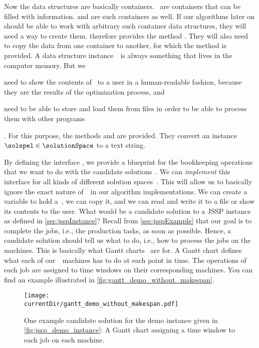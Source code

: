 Now the data structures are basically containers.
\numpyndarrays\ are containers that can be filled with information.
 and  are such containers as well.
If our algorithms later on should be able to work with arbitrary such container data structures, they will need a way to create them.
 therefore provides the method .
They will also need to copy the data from one container to another, for which the  method is provided.
A data structure instance~\solspel\ is always something that lives in the computer memory.
But we \begin{enumerate*}[label=\emph{\alph*})]%
\item need to show the contents of \solspel\ to a user in a human-readable fashion, because they are the results of the optimization process, and%
\item need to be able to store and load them from files in order to be able to process them with other programs%
\end{enumerate*}.
For this purpose, the methods  and  are provided.
They convert an instance $\solspel\in\solutionSpace$ to a text string.

By defining the interface , we provide a blueprint for the bookkeeping operations that we want to do with the candidate solutions~\solspel.
We can \emph{implement} this interface for all kinds of different solution spaces~\solutionSpace.
This will allow us to basically ignore the exact nature of~\solutionSpace\ in our algorithm implementations.
We can create a variable to hold a~\solspel, we can copy it, and we can read and write it to a file or show its contents to the user.
%
\endhsection%
%
%
%
What would be a candidate solution to a \gls{JSSP} instance as defined in \autoref{sec:jsspInstance}?
Recall from \autoref{sec:jsspExample} that our goal is to complete the jobs, i.e., the production tasks, as soon as possible.
Hence, a candidate solution should tell us what to do, i.e., how to process the jobs on the machines.%
%
%
\label{sec:jssp:gantt}%
%
This is basically what Gantt charts~\cite{W2003GCACA,K2000SORCP} are for.
A Gantt chart defines what each of our~\jsspMachines\ machines has to do at each point in time.
The operations of each job are assigned to time windows on their corresponding machines.
You can find an example illustrated in \autoref{fig:gantt_demo_without_makespan}.

\begin{figure}%
\centering%
\texttt{[image: \\currentDir/gantt\_demo\_without\_makespan.pdf]}%
\caption{One example candidate solution for the demo instance given in \autoref{fig:jssp_demo_instance}: A Gantt chart assigning a time window to each job on each machine.}%
\label{fig:gantt_demo_without_makespan}%
\end{figure}

